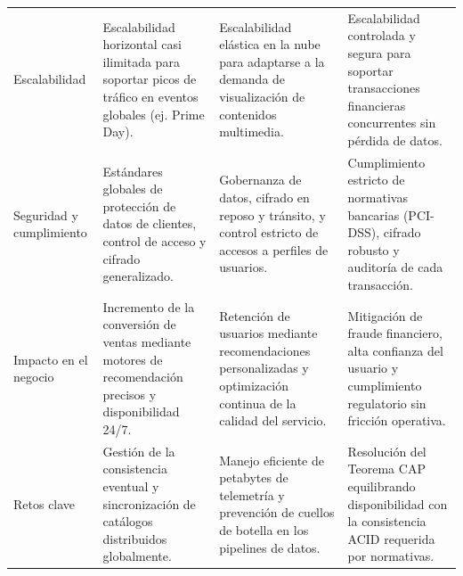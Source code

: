 \documentclass[12pt,a4paper]{article}
\begin{document}
\begin{center}
\begin{tabular}{@{}L{2.3cm} L{3.4cm} L{3.4cm} L{3.4cm}@{}}
\addlinespace
Escalabilidad & Escalabilidad horizontal casi ilimitada para soportar picos de tráfico en eventos globales (ej. Prime Day). & Escalabilidad elástica en la nube para adaptarse a la demanda de visualización de contenidos multimedia. & Escalabilidad controlada y segura para soportar transacciones financieras concurrentes sin pérdida de datos. \\
\addlinespace
Seguridad y cumplimiento & Estándares globales de protección de datos de clientes, control de acceso y cifrado generalizado. & Gobernanza de datos, cifrado en reposo y tránsito, y control estricto de accesos a perfiles de usuarios. & Cumplimiento estricto de normativas bancarias (PCI-DSS), cifrado robusto y auditoría de cada transacción. \\
\addlinespace
Impacto en el negocio & Incremento de la conversión de ventas mediante motores de recomendación precisos y disponibilidad 24/7. & Retención de usuarios mediante recomendaciones personalizadas y optimización continua de la calidad del servicio. & Mitigación de fraude financiero, alta confianza del usuario y cumplimiento regulatorio sin fricción operativa. \\
\addlinespace
Retos clave & Gestión de la consistencia eventual y sincronización de catálogos distribuidos globalmente. & Manejo eficiente de petabytes de telemetría y prevención de cuellos de botella en los pipelines de datos. & Resolución del Teorema CAP equilibrando disponibilidad con la consistencia ACID requerida por normativas. \\
\bottomrule
\end{tabular}
\end{center}

\vspace{0.3cm}

\end{document}
